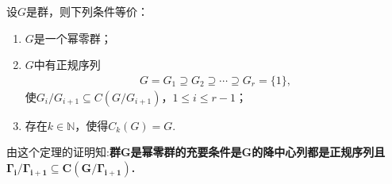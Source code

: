 \documentclass[../../main.tex]{subfiles}%
\begin{document}
\begin{theorem}
设$G$是群，则下列条件等价：
\begin{enumerate}[(1)]
\item $G$是一个幂零群；

\item $G$中有正规序列
\begin{align*}
G = G_1 \supseteq G_2 \supseteq \cdots \supseteq G_r = \{1\},
\end{align*}
使$G_i/G_{i+1} \subseteq C(G/G_{i+1})$，$1 \leqslant i \leqslant r - 1$；

\item 存在$k\in \mathbb{N}$，使得$C_k(G) = G$.
\end{enumerate}
\end{theorem}
\begin{remark}
由这个定理的证明知:\textbf{群G是幂零群的充要条件是G的降中心列都是正规序列且$\mathbf{\Gamma }_{\boldsymbol{i}}/\mathbf{\Gamma }_{\boldsymbol{i}+\mathbf{1}}\subseteq \boldsymbol{C}\left( \boldsymbol{G}/\mathbf{\Gamma }_{\boldsymbol{i}+\mathbf{1}} \right) $.}
\end{remark}
\end{document}
